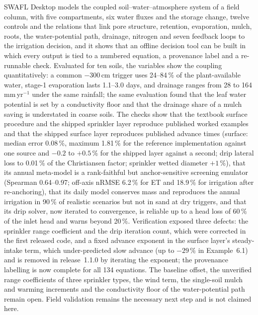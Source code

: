 \documentclass[preprint,12pt]{elsarticle}
\begin{document}
SWAFL Desktop models the coupled soil--water--atmosphere system of a field column, with five compartments, six water fluxes and the storage change, twelve controls and the relations that link pore structure, retention, evaporation, mulch, roots, the water-potential path, drainage, nitrogen and seven feedback loops to the irrigation decision, and it shows that an offline decision tool can be built in which every output is tied to a numbered equation, a provenance label and a re-runnable check. Evaluated for ten soils, the variables show the coupling quantitatively: a common $-300$\,cm trigger uses 24--84\,\% of the plant-available water, stage-1 evaporation lasts 1.1--3.0 days, and drainage ranges from 28 to 164\,mm\,yr$^{-1}$ under the same rainfall; the same evaluation found that the leaf water potential is set by a conductivity floor and that the drainage share of a mulch saving is understated in coarse soils. The checks show that the textbook surface procedure and the shipped sprinkler layer reproduce published worked examples and that the shipped surface layer reproduces published advance times (surface: median error 0.08\,\%, maximum 1.81\,\% for the reference implementation against one source and $-0.2$ to $+0.5$\,\% for the shipped layer against a second; drip lateral loss to 0.01\,\% of the Christiansen factor; sprinkler wetted diameter $+1$\,\%), that its annual meta-model is a rank-faithful but anchor-sensitive screening emulator (Spearman 0.64--0.97; off-axis nRMSE 6.2\,\% for ET and 18.9\,\% for irrigation after re-anchoring), that its daily model conserves mass and reproduces the annual irrigation in 90\,\% of realistic scenarios but not in sand at dry triggers, and that its drip solver, now iterated to convergence, is reliable up to a head loss of 60\,\% of the inlet head and warns beyond 20\,\%. Verification exposed three defects: the sprinkler range coefficient and the drip iteration count, which were corrected in the first released code, and a fixed advance exponent in the surface layer's steady-intake term, which under-predicted slow advance (up to $-29$\,\% in Example~6.1) and is removed in release~1.1.0 by iterating the exponent; the provenance labelling is now complete for all 134 equations. The baseline offset, the unverified range coefficients of three sprinkler types, the wind term, the single-soil mulch and warming increments and the conductivity floor of the water-potential path remain open. Field validation remains the necessary next step and is not claimed here.
\end{document}
